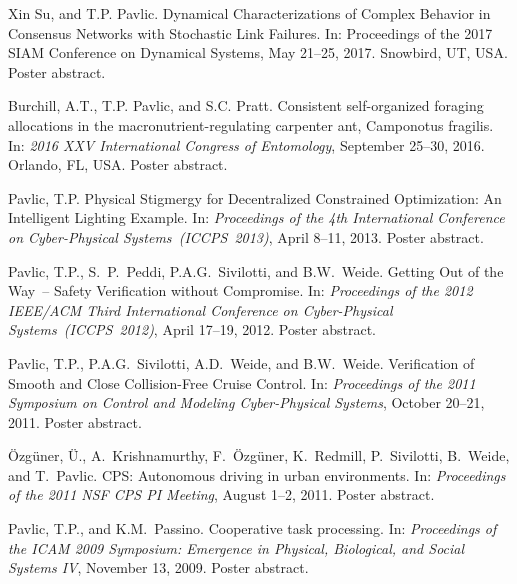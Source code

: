 \documentclass[10pt]{article}
\begin{document}
\begin{bibenum}
    \item Xin Su, and T.P. Pavlic. Dynamical Characterizations of
        Complex Behavior in Consensus Networks with Stochastic Link
        Failures. In: Proceedings of the 2017 SIAM Conference on
        Dynamical Systems, May 21--25, 2017. Snowbird, UT, USA. Poster
        abstract.

    \item Burchill, A.T., T.P. Pavlic, and S.C. Pratt. Consistent
        self-organized foraging allocations in the
        macronutrient-regulating carpenter ant, Camponotus fragilis. In:
        \emph{2016 XXV International Congress of
        Entomology}, September 25--30, 2016. Orlando, FL, USA. Poster
        abstract. 

    \item Pavlic, T.P. Physical Stigmergy for Decentralized Constrained
        Optimization: An Intelligent Lighting Example. In:
        \emph{Proceedings of the 4th International Conference on
        Cyber-Physical Systems~(ICCPS~2013)}, April 8--11, 2013.
        Poster abstract.

    \item Pavlic, T.P., S.~P.~Peddi, P.A.G.~Sivilotti, and B.W.~Weide.
        Getting Out of the Way~-- Safety Verification without
        Compromise. In: \emph{Proceedings of the 2012 IEEE/ACM Third
        International Conference on Cyber-Physical
        Systems~(ICCPS~2012)}, April 17--19, 2012. Poster abstract.

    \item Pavlic, T.P., P.A.G.~Sivilotti, A.D.~Weide, and B.W.~Weide.
        Verification of Smooth and Close Collision-Free Cruise Control.
        In: \emph{Proceedings of the 2011 Symposium on Control and
        Modeling Cyber-Physical Systems}, October 20--21, 2011. Poster
        abstract.

    \item {\"{O}}zg{\"{u}}ner, {\"{U}}., A.~Krishnamurthy,
        F.~{\"{O}}zg{\"{u}}ner, K.~Redmill, P.~Sivilotti, B.~Weide,
        and T.~Pavlic.
        CPS: Autonomous driving in urban environments.
        In: \emph{Proceedings of the 2011 NSF CPS PI Meeting},
        August 1--2, 2011. Poster abstract.

    \item Pavlic, T.P., and K.M.~Passino. Cooperative task
        processing. In: \emph{Proceedings of the ICAM 2009 Symposium:
        Emergence in Physical, Biological, and Social Systems IV},
        November 13, 2009. Poster abstract.

\end{bibenum}
\end{document}
